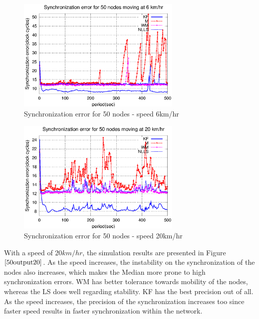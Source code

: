 \documentclass[a4paper,10pt]{report}
\begin{document}
\paragraph*{}
\begin{figure}
\centering
\includegraphics[width=0.7\textwidth]{50output-s6}
\caption{Synchronization error for 50 nodes - speed 6km/hr}
\label{50output6}
\end{figure}
\begin{figure}
\centering
\includegraphics[width=0.7\textwidth]{50output-s20}
\caption{Synchronization error for 50 nodes - speed 20km/hr} \label{50output20}
\end{figure}
With a speed of $20km/hr$, the simulation results are presented in Figure $\ref{50output20}$. As the speed increases, the instability
on the synchronization of the nodes also increases, which makes the Median more prone to high synchronization errors. WM has better
tolerance towards mobility of the nodes, whereas the LS does well regarding stability. KF has the best precision out of all. As the
speed increases, the precision of the synchronization increases too since faster speed results in faster synchronization within the network.
\end{document}
